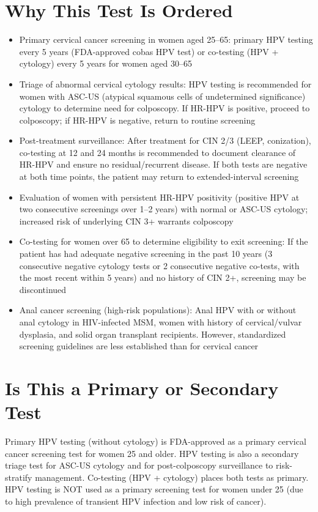 \section*{Why This Test Is Ordered}
\begin{itemize}
  \item Primary cervical cancer screening in women aged 25--65: primary HPV testing every 5 years (FDA-approved cobas HPV test) or co-testing (HPV + cytology) every 5 years for women aged 30--65
  \item Triage of abnormal cervical cytology results: HPV testing is recommended for women with ASC-US (atypical squamous cells of undetermined significance) cytology to determine need for colposcopy. If HR-HPV is positive, proceed to colposcopy; if HR-HPV is negative, return to routine screening
  \item Post-treatment surveillance: After treatment for CIN 2/3 (LEEP, conization), co-testing at 12 and 24 months is recommended to document clearance of HR-HPV and ensure no residual/recurrent disease. If both tests are negative at both time points, the patient may return to extended-interval screening
  \item Evaluation of women with persistent HR-HPV positivity (positive HPV at two consecutive screenings over 1--2 years) with normal or ASC-US cytology; increased risk of underlying CIN 3+ warrants colposcopy
  \item Co-testing for women over 65 to determine eligibility to exit screening: If the patient has had adequate negative screening in the past 10 years (3 consecutive negative cytology tests or 2 consecutive negative co-tests, with the most recent within 5 years) and no history of CIN 2+, screening may be discontinued
  \item Anal cancer screening (high-risk populations): Anal HPV with or without anal cytology in HIV-infected MSM, women with history of cervical/vulvar dysplasia, and solid organ transplant recipients. However, standardized screening guidelines are less established than for cervical cancer
\end{itemize}

\section*{Is This a Primary or Secondary Test}
Primary HPV testing (without cytology) is FDA-approved as a primary cervical cancer screening test for women 25 and older. HPV testing is also a secondary triage test for ASC-US cytology and for post-colposcopy surveillance to risk-stratify management. Co-testing (HPV + cytology) places both tests as primary. HPV testing is NOT used as a primary screening test for women under 25 (due to high prevalence of transient HPV infection and low risk of cancer).

